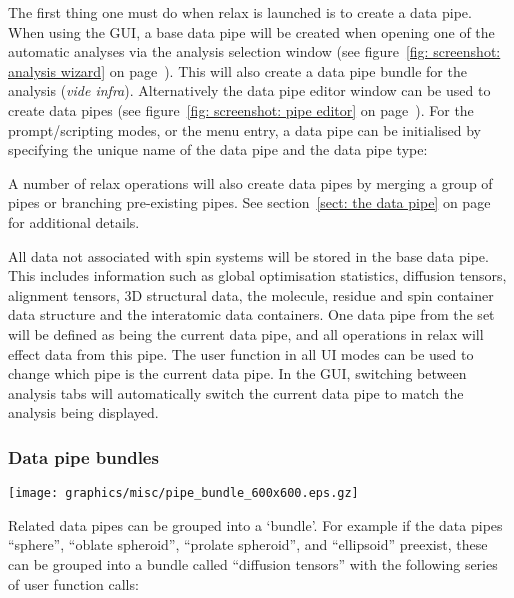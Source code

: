 The first thing one must do when relax is launched is to create a data pipe.  When using the GUI, a base data pipe will be created when opening one of the automatic analyses via the analysis selection window (see figure~\ref{fig: screenshot: analysis wizard} on page~\pageref{fig: screenshot: analysis wizard}).  This will also create a data pipe bundle for the analysis (\textit{vide infra}).  Alternatively the data pipe editor window can be used to create data pipes (see figure~\ref{fig: screenshot: pipe editor} on page~\pageref{fig: screenshot: pipe editor}).  For the prompt/scripting modes, or the  menu entry, a data pipe can be initialised by specifying the unique name of the data pipe and the data pipe type:


A number of relax operations will also create data pipes by merging a group of pipes or branching pre-existing pipes.  See section~\ref{sect: the data pipe} on page~\pageref{sect: the data pipe} for additional details.

All data not associated with spin systems will be stored in the base data pipe.  This includes information such as global optimisation statistics, diffusion tensors, alignment tensors, 3D structural data, the molecule, residue and spin container data structure and the interatomic data containers.  One data pipe from the set will be defined as being the current data pipe, and all operations in relax will effect data from this pipe.  The  user function in all UI modes can be used to change which pipe is the current data pipe.  In the GUI, switching between analysis tabs will automatically switch the current data pipe to match the analysis being displayed.


\subsubsection{Data pipe bundles}

\begin{figure*}[h]
\texttt{[image: graphics/misc/pipe\_bundle\_600x600.eps.gz]}
\end{figure*}

Related data pipes can be grouped into a `bundle'.  For example if the data pipes ``sphere'', ``oblate spheroid'', ``prolate spheroid'', and ``ellipsoid'' preexist, these can be grouped into a bundle called ``diffusion tensors'' with the following series of user function calls:

